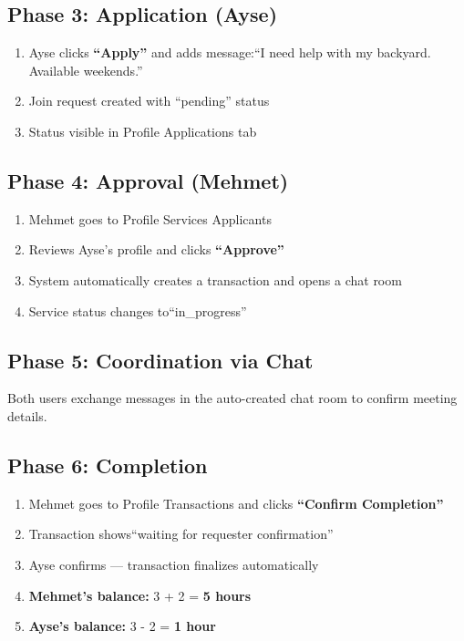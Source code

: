 \documentclass[11pt,a4paper]{report}
\begin{document}
\subsection{Phase 3: Application (Ayse)}

\begin{enumerate}
    \item Ayse clicks \textbf{``Apply''} and adds message:``I need help with my backyard. Available weekends.''
    \item Join request created with ``pending'' status
    \item Status visible in Profile \textrightarrow{} Applications tab
\end{enumerate}

\subsection{Phase 4: Approval (Mehmet)}

\begin{enumerate}
    \item Mehmet goes to Profile \textrightarrow{} Services \textrightarrow{} Applicants
    \item Reviews Ayse's profile and clicks \textbf{``Approve''}
    \item System automatically creates a transaction and opens a chat room
    \item Service status changes to``in\_progress''
\end{enumerate}

\subsection{Phase 5: Coordination via Chat}

Both users exchange messages in the auto-created chat room to confirm meeting details.

\subsection{Phase 6: Completion}

\begin{enumerate}
    \item Mehmet goes to Profile \textrightarrow{} Transactions and clicks \textbf{``Confirm Completion''}
    \item Transaction shows``waiting for requester confirmation''
    \item Ayse confirms --- transaction finalizes automatically
    \item \textbf{Mehmet's balance:} 3 + 2 = \textbf{5 hours}
    \item \textbf{Ayse's balance:} 3 - 2 = \textbf{1 hour}
\end{enumerate}
\end{document}
